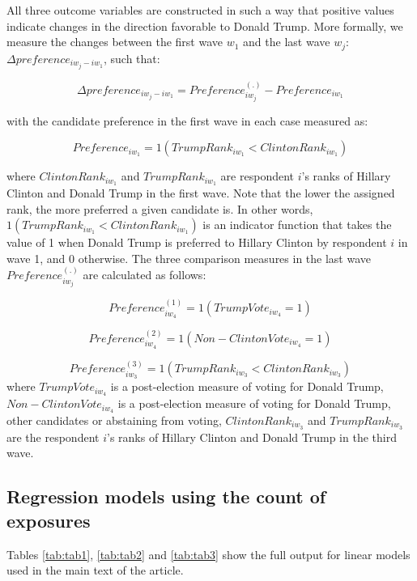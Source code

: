 \documentclass[
  12pt,
]{article}
\begin{document}
All three outcome variables are constructed in such a way that positive values indicate changes in the direction favorable to Donald Trump. More formally, we measure the changes between the first wave \(w_1\) and the last wave \(w_j\): \(\Delta preference_{{iw_{j}}-{iw_{1}}}\), such that:

\[\Delta preference_{{iw_{j}}-{iw_{1}}} = Preference^{(.)}_{iw_{j}} - Preference_{iw_{1}}\]

with the candidate preference in the first wave in each case measured as:

\[Preference_{iw_{1}} = 1(TrumpRank_{iw_{1}} < ClintonRank_{iw_{1}})\]

where \(ClintonRank_{iw_{1}}\) and \(TrumpRank_{iw_{1}}\) are respondent \(i\)'s ranks of Hillary Clinton and Donald Trump in the first wave. Note that the lower the assigned rank, the more preferred a given candidate is. In other words, \(1(TrumpRank_{iw_{1}} < ClintonRank_{iw_{1}})\) is an indicator function that takes the value of 1 when Donald Trump is preferred to Hillary Clinton by respondent \(i\) in wave 1, and 0 otherwise. The three comparison measures in the last wave \(Preference^{(.)}_{iw_{j}}\) are calculated as follows:

\[Preference^{(1)}_{iw_{4}} = 1(TrumpVote_{iw_{4}} = 1)\]

\[Preference^{(2)}_{iw_{4}} = 1(Non-ClintonVote_{iw_{4}} = 1)\]

\[Preference^{(3)}_{iw_{3}} = 1(TrumpRank_{iw_{3}} < ClintonRank_{iw_{3}})\]
where \(TrumpVote_{iw_{4}}\) is a post-election measure of voting for Donald Trump, \(Non-ClintonVote_{iw_{4}}\) is a post-election measure of voting for Donald Trump, other candidates or abstaining from voting, \(ClintonRank_{iw_{3}}\) and \(TrumpRank_{iw_{3}}\) are the respondent \(i\)'s ranks of Hillary Clinton and Donald Trump in the third wave.

\clearpage

\hypertarget{regression-models-using-the-count-of-exposures}{%
\subsection{Regression models using the count of exposures}\label{regression-models-using-the-count-of-exposures}}

Tables \ref{tab:tab1}, \ref{tab:tab2} and \ref{tab:tab3} show the full output for linear models used in the main text of the article.
\end{document}
